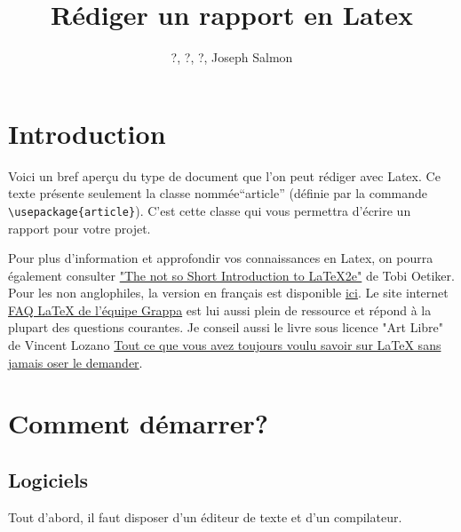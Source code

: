 \documentclass[a4paper,10pt]{article}
\title{Rédiger un rapport en Latex
}
\author{?, ?, ?, Joseph Salmon}
\date {}
\begin{document}
\sloppy
\maketitle
\tableofcontents 


\newpage
\printnomenclature

\section{Introduction}

Voici un bref aperçu du type de document que l'on peut rédiger avec  Latex.
Ce texte  présente seulement la classe nommée``article'' 
(définie par la commande \lstinline+\usepackage{article}+). 
C'est cette classe  qui vous permettra d'écrire un rapport pour votre projet.


Pour plus d'information et approfondir vos connaissances en Latex, on pourra également consulter   
\href{http://tobi.oetiker.ch/lshort/}{"The not so Short Introduction to LaTeX2e"} de Tobi Oetiker. 
Pour les non anglophiles, la version  en français est disponible  
\href{http://www.laas.fr/~matthieu/cours/latex2e/}{ici}. 
Le site internet \href{http://www.grappa.univ-lille3.fr/FAQ-LaTeX/}{FAQ LaTeX de l'équipe Grappa} 
est lui aussi plein de ressource et répond à la plupart des questions courantes. 
Je conseil aussi le livre sous licence "Art Libre" de Vincent Lozano 
\href{http://www.framabook.org/latex.html}{Tout ce que vous avez toujours voulu savoir sur LaTeX sans jamais oser le demander}.



\section{Comment démarrer?}


\subsection{Logiciels}
Tout d'abord, il faut disposer d'un éditeur de texte et d'un compilateur.
\end{document}
